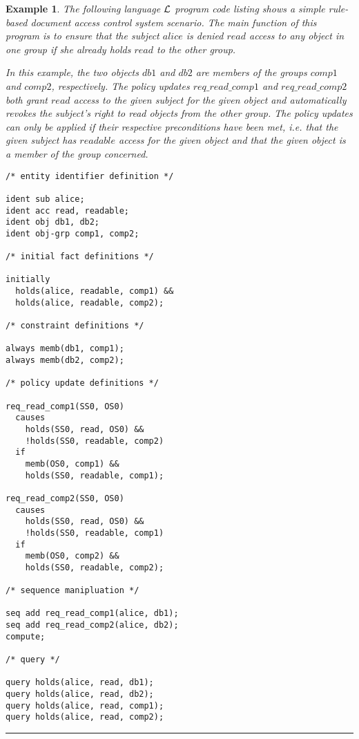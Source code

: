 \documentclass[10pt, twocolumn]{article}
\newtheorem{examp}{Example}
\newenvironment{example}{\begin{examp}\rm}{\rule{2mm}{2mm}\end{examp}}
\begin{document}
        \begin{example}
          The following language ${\cal L}$ program code listing shows a simple
          rule-based document access control system scenario. The main function
          of this program is to ensure that the subject $alice$ is denied
          $read$ access to any object in one group if she already holds $read$
          to the other group.

          In this example, the two objects $db1$ and $db2$ are members of the
          groups $comp1$ and $comp2$, respectively. The policy updates
          $req\_read\_comp1$ and $req\_read\_comp2$ both grant $read$ access
          to the given subject for the given object and automatically revokes
          the subject's right to read objects from the other group. The policy
          updates can only be applied if their respective preconditions have
          been met, i.e. that the given subject has $readable$ access for the
          given object and that the given object is a member of the group
          concerned.

          \begin{verbatim}
/* entity identifier definition */

ident sub alice;
ident acc read, readable;
ident obj db1, db2;
ident obj-grp comp1, comp2;

/* initial fact definitions */

initially
  holds(alice, readable, comp1) &&
  holds(alice, readable, comp2);

/* constraint definitions */

always memb(db1, comp1);
always memb(db2, comp2);

/* policy update definitions */

req_read_comp1(SS0, OS0)
  causes
    holds(SS0, read, OS0) &&
    !holds(SS0, readable, comp2)
  if
    memb(OS0, comp1) &&
    holds(SS0, readable, comp1);

req_read_comp2(SS0, OS0)
  causes
    holds(SS0, read, OS0) &&
    !holds(SS0, readable, comp1)
  if
    memb(OS0, comp2) &&
    holds(SS0, readable, comp2);

/* sequence manipluation */

seq add req_read_comp1(alice, db1);
seq add req_read_comp2(alice, db2);
compute;

/* query */

query holds(alice, read, db1);
query holds(alice, read, db2);
query holds(alice, read, comp1);
query holds(alice, read, comp2);
          \end{verbatim}
        \end{example}
\end{document}
